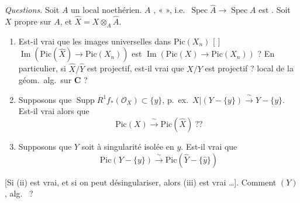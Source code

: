 \documentclass[11pt,a4paper]{article}
\begin{document}
\emph{Questions.} \struck{\ill{}} Soit $A$ un  local  noethérien.   $A$ \emph{},   «   », i.e.\ $\operatorname{Spec}\hat{A} \to \operatorname{Spec} A$ est \struck{\ill{}}  . Soit $X$ propre sur $A$, et $\hat{X} = X \otimes_A \hat{A}$.
\begin{enumerate}
  \item[(i)] Est-il vrai que les images universelles dans $\mathrm{Pic}(X_n)$ [   \struck{\ill{}} ]  $\operatorname{Im}(\mathrm{Pic}(\hat{X}) \to \mathrm{Pic}(X_n))$ est  $\operatorname{Im}(\mathrm{Pic}(X) \to \mathrm{Pic}(X_n))$ ? En particulier, si $\hat{X}/\hat{Y}$ est projectif, est-il vrai que $X/Y$ est projectif ? \struck{\ill{}}      local de la géom.\ alg.\ sur $\mathbf{C}$ ?
  \item[(ii)] Supposons que $\operatorname{Supp} R^1 f_*(\mathcal{O}_X) \subset \{y\}$, \struck{\ill{}} p.\ ex.\ $X|(Y-\{y\}) \xrightarrow{\ \sim\ } Y - \{y\}$. Est-il vrai alors que
  \[
  \mathrm{Pic}(X) \xrightarrow{\ \sim\ } \mathrm{Pic}(\hat{X}) \ ??
  \]
  \item[(iii)]  Supposons que $Y$ soit à singularité isolée en $y$. Est-il vrai que
  \[
  \mathrm{Pic}(Y - \{y\}) \xrightarrow{\ \sim\ } \mathrm{Pic}(\hat{Y} - \{\hat{y}\})
  \]
\end{enumerate}
[Si (ii) est vrai, et si on peut désingulariser, alors (iii) est vrai …]. Comment     \add{\ill{}}     $(Y)$,      alg.\  ?
\end{document}
